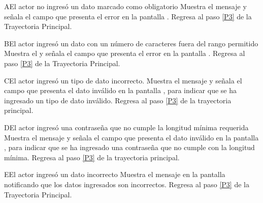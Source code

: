 		\begin{UCtrayectoriaA}{A}{El actor no ingresó un dato marcado como obligatorio}
			\UCpaso[\UCsist] Muestra el mensaje  y señala el campo que presenta el error en la pantalla .
			\UCpaso[\UCactor] Regresa al paso \ref{P3} de la Trayectoria Principal.
		\end{UCtrayectoriaA}

		\begin{UCtrayectoriaA}{B}{El actor ingresó un dato con un número de caracteres fuera del rango permitido}
	\UCpaso[\UCsist] Muestra el  y señala el campo que presenta el error en la pantalla .
	\UCpaso[\UCactor] Regresa al paso \ref{P3} de la Trayectoria Principal.
\end{UCtrayectoriaA}

	\begin{UCtrayectoriaA}{C}{El actor ingresó un tipo de dato incorrecto.}
		\UCpaso[\UCsist] Muestra el mensaje  y señala el campo que presenta el dato inválido en la pantalla , para indicar que se ha ingresado un tipo de dato inválido.
		\UCpaso Regresa al paso \ref{P3} de la trayectoria principal.
	\end{UCtrayectoriaA}

	\begin{UCtrayectoriaA}{D}{El actor ingresó una contraseña que no cumple la longitud mínima requerida}
		\UCpaso[\UCsist] Muestra el mensaje  y señala el campo que presenta el dato inválido en la pantalla , para indicar que se ha ingresado una contraseña que no cumple con la longitud mínima.
		\UCpaso Regresa al paso \ref{P3} de la trayectoria principal.
	\end{UCtrayectoriaA}
		\begin{UCtrayectoriaA}{E}{El actor ingresó un dato incorrecto}
	\UCpaso[\UCsist] Muestra el mensaje  en la pantalla  notificando que los datos ingresados son incorrectos.
	\UCpaso[\UCactor] Regresa al paso \ref{P3} de la Trayectoria Principal.
\end{UCtrayectoriaA}
